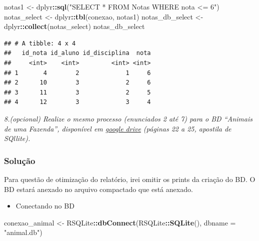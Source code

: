 \documentclass[
]{article}
\newenvironment{Shaded}{\begin{snugshade}}{\end{snugshade}}
\newcommand{\AttributeTok}[1]{\textcolor[rgb]{0.13,0.29,0.53}{#1}}
\newcommand{\FunctionTok}[1]{\textcolor[rgb]{0.13,0.29,0.53}{\textbf{#1}}}
\newcommand{\NormalTok}[1]{#1}
\newcommand{\OtherTok}[1]{\textcolor[rgb]{0.56,0.35,0.01}{#1}}
\newcommand{\SpecialCharTok}[1]{\textcolor[rgb]{0.81,0.36,0.00}{\textbf{#1}}}
\newcommand{\StringTok}[1]{\textcolor[rgb]{0.31,0.60,0.02}{#1}}
\providecommand{\tightlist}{%
  \setlength{\itemsep}{0pt}\setlength{\parskip}{0pt}}
\begin{document}
\begin{Shaded}
\begin{Highlighting}[]
\NormalTok{notas1 }\OtherTok{\textless{}{-}}\NormalTok{ dplyr}\SpecialCharTok{::}\FunctionTok{sql}\NormalTok{(}\StringTok{"SELECT * FROM Notas WHERE nota \textless{}= 6"}\NormalTok{)}
\NormalTok{notas\_select }\OtherTok{\textless{}{-}}\NormalTok{ dplyr}\SpecialCharTok{::}\FunctionTok{tbl}\NormalTok{(conexao, notas1)}
\NormalTok{notas\_db\_select }\OtherTok{\textless{}{-}}\NormalTok{ dplyr}\SpecialCharTok{::}\FunctionTok{collect}\NormalTok{(notas\_select)}
\NormalTok{notas\_db\_select}
\end{Highlighting}
\end{Shaded}

\begin{verbatim}
## # A tibble: 4 x 4
##   id_nota id_aluno id_disciplina  nota
##     <int>    <int>         <int> <int>
## 1       4        2             1     6
## 2      10        3             2     6
## 3      11        3             2     5
## 4      12        3             3     4
\end{verbatim}

\emph{8.(opcional) Realize o mesmo processo (enunciados 2 até 7) para o
BD ``Animais de uma Fazenda'', disponível em
\href{https://drive.google.com/file/d/1manYTl1tuIXJYyc0jsub7sGmrS4AuGgD/view?usp=drive_link}{google
drive} (páginas 22 a 25, apostila de SQllite).}

\subsubsection{Solução}\label{soluuxe7uxe3o-7}

Para questão de otimização do relatório, irei omitir os prints da
criação do BD. O BD estará anexado no arquivo compactado que está
anexado.

\begin{itemize}
\tightlist
\item
  Conectando no BD
\end{itemize}

\begin{Shaded}
\begin{Highlighting}[]
\NormalTok{conexao\_animal }\OtherTok{\textless{}{-}}\NormalTok{ RSQLite}\SpecialCharTok{::}\FunctionTok{dbConnect}\NormalTok{(RSQLite}\SpecialCharTok{::}\FunctionTok{SQLite}\NormalTok{(), }\AttributeTok{dbname =} \StringTok{"animal.db"}\NormalTok{)}
\end{Highlighting}
\end{Shaded}
\end{document}
